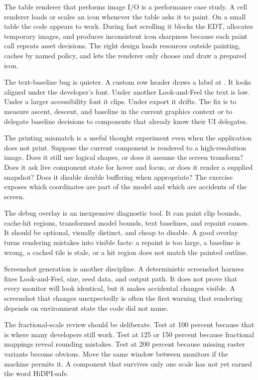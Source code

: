 The table renderer that performs image I/O is a performance case study. A cell renderer loads or scales an icon whenever the table asks it to paint. On a small table the code appears to work. During fast scrolling it blocks the EDT, allocates temporary images, and produces inconsistent icon sharpness because each paint call repeats asset decisions. The right design loads resources outside painting, caches by named policy, and lets the renderer only choose and draw a prepared icon.

The text-baseline bug is quieter. A custom row header draws a label at . It looks aligned under the developer's font. Under another Look-and-Feel the text is low. Under a larger accessibility font it clips. Under export it drifts. The fix is to measure ascent, descent, and baseline in the current graphics context or to delegate baseline decisions to components that already know their UI delegates.

The printing mismatch is a useful thought experiment even when the application does not print. Suppose the current component is rendered to a high-resolution image. Does it still use logical shapes, or does it assume the screen transform? Does it ask live component state for hover and focus, or does it render a supplied snapshot? Does it disable double buffering when appropriate? The exercise exposes which coordinates are part of the model and which are accidents of the screen.

The debug overlay is an inexpensive diagnostic tool. It can paint clip bounds, cache-hit regions, transformed model bounds, text baselines, and repaint causes. It should be optional, visually distinct, and cheap to disable. A good overlay turns rendering mistakes into visible facts: a repaint is too large, a baseline is wrong, a cached tile is stale, or a hit region does not match the painted outline.

Screenshot generation is another discipline. A deterministic screenshot harness fixes Look-and-Feel, size, seed data, and output path. It does not prove that every monitor will look identical, but it makes accidental changes visible. A screenshot that changes unexpectedly is often the first warning that rendering depends on environment state the code did not name.

The fractional-scale review should be deliberate. Test at 100 percent because that is where many developers still work. Test at 125 or 150 percent because fractional mappings reveal rounding mistakes. Test at 200 percent because missing raster variants become obvious. Move the same window between monitors if the machine permits it. A component that survives only one scale has not yet earned the word HiDPI-safe.


